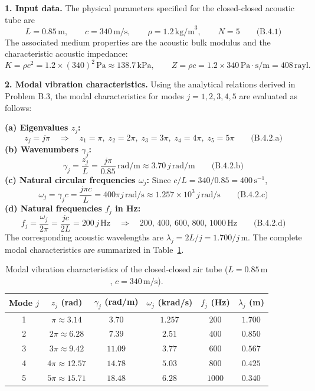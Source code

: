 \textbf{1. Input data.} The physical parameters specified for the closed-closed acoustic tube are
\[
\boxed{L=0.85\,\mathrm{m},\qquad c=340\,\mathrm{m/s},\qquad \rho=1.2\,\mathrm{kg/m}^3,\qquad N=5}\qquad\text{(B.4.1)}
\]
The associated medium properties are the acoustic bulk modulus and the characteristic acoustic impedance:
\[
K=\rho c^2=1.2\times(340)^2\,\mathrm{Pa}\approx138.7\,\mathrm{kPa},
\qquad
Z=\rho c=1.2\times 340\,\mathrm{Pa\cdot s/m}=408\,\mathrm{rayl}.
\]

\textbf{2. Modal vibration characteristics.} Using the analytical relations derived in Problem B.3, the modal characteristics for modes $j=1,2,3,4,5$ are evaluated as follows:
\par\smallskip\noindent
\textbf{(a) Eigenvalues $z_j$:}
\[
\boxed{z_j=j\pi\quad\Longrightarrow\quad z_1=\pi,\; z_2=2\pi,\; z_3=3\pi,\; z_4=4\pi,\; z_5=5\pi}\qquad\text{(B.4.2.a)}
\]
\textbf{(b) Wavenumbers $\gamma_j$:}
\[
\boxed{\gamma_j=\frac{z_j}{L}=\frac{j\pi}{0.85}\,\mathrm{rad/m}\approx 3.70\,j\,\mathrm{rad/m}}\qquad\text{(B.4.2.b)}
\]
\textbf{(c) Natural circular frequencies $\omega_j$:} Since $c/L=340/0.85=400\,\mathrm{s}^{-1}$,
\[
\boxed{\omega_j=\gamma_j c=\frac{j\pi c}{L}=400\pi j\,\mathrm{rad/s}\approx 1.257\times10^3\,j\,\mathrm{rad/s}}\qquad\text{(B.4.2.c)}
\]
\textbf{(d) Natural frequencies $f_j$ in Hz:}
\[
\boxed{f_j=\frac{\omega_j}{2\pi}=\frac{jc}{2L}=200\,j\,\mathrm{Hz}\quad\Longrightarrow\quad 200,\,400,\,600,\,800,\,1000\,\mathrm{Hz}}\qquad\text{(B.4.2.d)}
\]
The corresponding acoustic wavelengths are $\lambda_j=2L/j=1.700/j\,\mathrm{m}$. The complete modal characteristics are summarized in Table~\ref{tab:hw02-b4-modal}.

\begin{table}[H]
\centering
\caption{Modal vibration characteristics of the closed-closed air tube ($L=0.85\,\mathrm{m}$, $c=340\,\mathrm{m/s}$).}
\label{tab:hw02-b4-modal}
\smallskip
\small
\begin{tabular}{@{}cccccc@{}}
\toprule
Mode $j$ & $z_j$ (rad) & $\gamma_j$ (rad/m) & $\omega_j$ (krad/s) & $f_j$ (Hz) & $\lambda_j$ (m) \\
\midrule
1 & $\pi\approx 3.14$ & $3.70$ & $1.257$ & $200$ & $1.700$ \\
2 & $2\pi\approx 6.28$ & $7.39$ & $2.51$ & $400$ & $0.850$ \\
3 & $3\pi\approx 9.42$ & $11.09$ & $3.77$ & $600$ & $0.567$ \\
4 & $4\pi\approx 12.57$ & $14.78$ & $5.03$ & $800$ & $0.425$ \\
5 & $5\pi\approx 15.71$ & $18.48$ & $6.28$ & $1000$ & $0.340$ \\
\bottomrule
\end{tabular}
\end{table}

